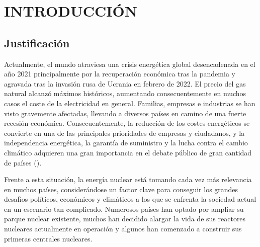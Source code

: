 \section{INTRODUCCIÓN} \label{sec:introduccion}

\subsection{Justificación}

Actualmente, el mundo atraviesa una crisis energética global desencadenada en el año 2021 principalmente por la recuperación económica tras la pandemia y agravada tras la invasión rusa de Ucrania en febrero de 2022. El precio del gas natural alcanzó máximos históricos, aumentando consecuentemente en muchos casos el coste de la electricidad en general. Familias, empresas e industrias se han visto gravemente afectadas, llevando a diversos países en camino de una fuerte recesión económica. Consecuentemente, la reducción de los costes energéticos se convierte en una de las principales prioridades de empresas y ciudadanos, y la independencia energética, la
garantía de suministro y la lucha contra el cambio climático adquieren una gran importancia en el debate público de gran cantidad de países (\cite{crisis_energetica_iea}). 

Frente a esta situación, la energía nuclear está tomando cada vez más relevancia en muchos países, considerándose un factor clave para conseguir los grandes desafíos políticos, económicos y climáticos  a los que se enfrenta la sociedad actual en un escenario tan complicado. Numerosos países han optado por ampliar su parque nuclear existente, muchos han decidido alargar la vida de sus reactores nucleares actualmente en operación y algunos han comenzado a construir sus primeras centrales nucleares. 

